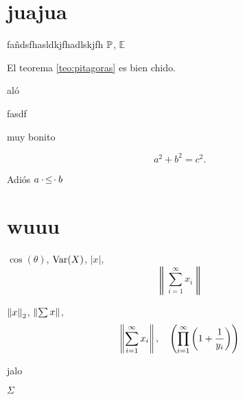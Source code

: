 \documentclass[openany,article]{memoir}
\begin{document}
\chapter{juajua}

fañdsfhasldkjfhadlskjfh $\mathbb P$, $\mathbb E$

El teorema \ref{teo:pitagoras} es bien chido.

\begin{corollary}
    aló
\end{corollary}

\begin{theorem}
    fasdf
\end{theorem}

\begin{lemma}
    muy bonito
\end{lemma}

\begin{theorem}[de Pitágoras] \label{teo:pitagoras}
    \[a^2 + b^2 = c^2.\]
\end{theorem}

\begin{example}
    Adiós $a \mathbin{\cdot\!\leq\!\cdot} b$
\end{example}

\chapter{wuuu}

\begin{theorem}
    $\cos(\theta)$, $\operatorname{Var}(X)$, $\lvert x \rvert$, 
    \[
        \left\lVert \sum_{i = 1}^\infty x_i \right\rVert
    \]
\end{theorem}

\begin{lemma}
    $\left\lVert x \right\rVert_2$, $\left\lVert \sum x \right\rVert$, 
    \[ \left\lVert \sum_{i = 1}^\infty x_i \right\rVert, \quad \left( \prod_{i = 1}^\infty \left(  1 + \frac{1}{y_i}  \right)  \right) \]
\end{lemma}

\begin{example}
    jalo
\end{example}

\begin{remark}
    $\Sigma$
\end{remark}
\end{document}
